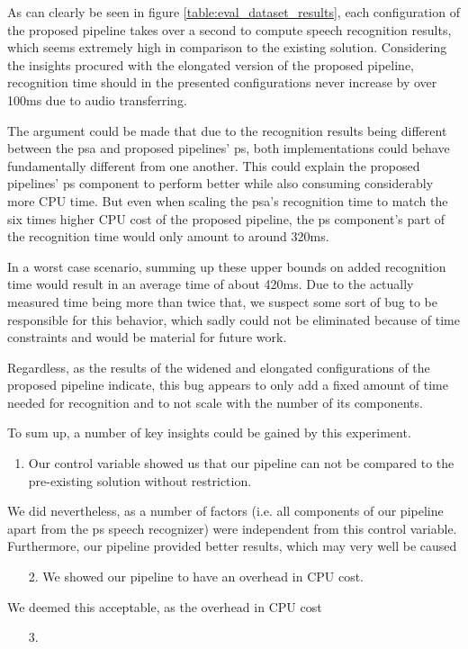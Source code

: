 { %
As can clearly be seen in figure \ref{table:eval_dataset_results}, each configuration of the proposed pipeline takes over a second to compute speech recognition results, which seems extremely high in comparison to the existing solution.
Considering the insights procured with the elongated version of the proposed pipeline, recognition time should in the presented configurations never increase by over 100ms due to audio transferring.

The argument could be made that due to the recognition results being different between the \gls{psa} and proposed pipelines' \gls{ps}, both implementations could behave fundamentally different from one another.
This could explain the proposed pipelines' \gls{ps} component to perform better while also consuming considerably more CPU time.
But even when scaling the \gls{psa}'s recognition time to match the six times higher CPU cost of the proposed pipeline, the \gls{ps} component's part of the recognition time would only amount to around 320ms.

In a worst case scenario, summing up these upper bounds on added recognition time would result in an average time of about 420ms.  
Due to the actually measured time being more than twice that, we suspect some sort of bug to be responsible for this behavior, which sadly could not be eliminated because of time constraints and would be material for future work.

Regardless, as the results of the widened and elongated configurations of the proposed pipeline indicate, this bug appears to only add a fixed amount of time needed for recognition and to not scale with the number of its components. 
}

To sum up, a number of key insights could be gained by this experiment.

\begin{enumerate}
	\item Our control variable showed us that our pipeline can not be compared to the pre-existing solution without restriction.
\end{enumerate}
We did nevertheless, as a number of factors (i.e. all components of our pipeline apart from the \gls{ps} speech recognizer) were independent from this control variable.
Furthermore, our pipeline provided better results, which may very well be caused 


\begin{enumerate}
	\item[2.] We showed our pipeline to have an overhead in CPU cost.
\end{enumerate}
We deemed this acceptable, as the overhead in CPU cost 

\begin{enumerate}
	\item[3.] 
\end{enumerate}




